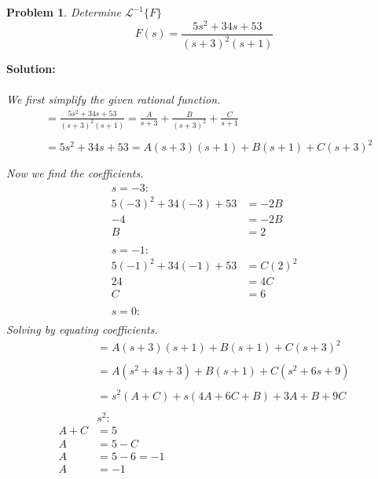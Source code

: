 \documentclass{article}
\newtheorem{problem}{Problem}
\begin{document}
    \begin{problem}
        Determine $\mathcal{L}^{-1}\{F\}$ 
        \[
            F(s) = \frac{5s^{2} + 34s + 53}{(s + 3)^{2}(s + 1)}
        \]
    \end{problem}
    \textbf{Solution:} \\ \\
    \textit{We first simplify the given rational function.} \\
    \begin{align*}
        &= \frac{5s^{2} + 34s + 53}{(s + 3)^{2}(s + 1)} = \frac{A}{s + 3} + \frac{B}{(s + 3)^{2}} + \frac{C}{s + 1} \\ \\
        &= 5s^{2} + 34s + 53 = A(s + 3)(s + 1) + B(s + 1) + C(s + 3)^{2} \\ \\
    \end{align*}
    \textit{Now we find the coefficients.} \\
    \begin{align*}
        s = -3: \\
        5(-3)^{2} + 34(-3) + 53 &= -2B \\
        -4 &= -2B \\
        B &= 2 \\ \\ 
        s = -1: \\
        5(-1)^{2} + 34(-1) + 53 &=  C(2)^{2} \\
        24 &= 4C \\
        C &= 6 \\ \\
        s = 0: \\
    \end{align*}
    \textit{Solving by equating coefficients.} \\
    \begin{align*}
        &=A(s + 3)(s + 1) + B(s + 1) + C(s + 3)^{2} \\ \\
        &= A(s^{2} + 4s + 3) + B(s + 1) + C(s^{2} + 6s + 9) \\ \\
        &= s^{2}(A + C) + s(4A + 6C + B) + 3A + B + 9C \\ \\
        &s^{2}: \\
        A + C &= 5 \\
        A &= 5 - C \\ 
        A &= 5 - 6 = -1 \\
        A &= -1 \\ \\
    \end{align*} 
\end{document}
